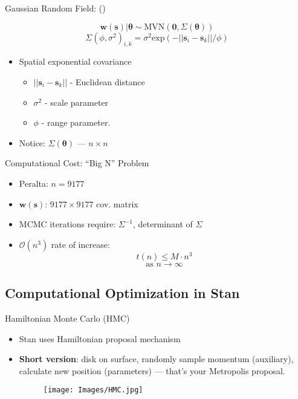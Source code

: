 \documentclass{beamer}
\begin{document}
\begin{frame}{Gaussian Random Field: ()}{} %

$$\pmb{w}(\pmb{s}) | \pmb{\theta} \sim \text{MVN}(\pmb{0}, \Sigma(\pmb{\theta}))$$
$$\Sigma(\phi, \sigma^{2})_{i,k} = \sigma^{2} \text{exp}(-||\pmb{s}_{i} - \pmb{s}_{k}||/\phi)$$
\begin{itemize}
\addtolength{\itemsep}{0.5\baselineskip}
\item Spatial exponential covariance
  \begin{itemize}
  \addtolength{\itemsep}{0.5\baselineskip}
  \item $||\pmb{s}_{i} - \pmb{s}_{k}||$ - Euclidean distance
  \item $\sigma^{2}$ - scale parameter
  \item $\phi$ - range parameter.
  \end{itemize}
\item Notice: $\Sigma(\pmb{\theta})$ --- $n \times n$
\end{itemize}

\end{frame}


\begin{frame}{Computational Cost: ``Big N'' Problem}{}
\begin{itemize}
\addtolength{\itemsep}{0.5\baselineskip}
\item Peralta: $n = 9177$
\item $\pmb{w}(\pmb{s})$: $9177 \times 9177$ cov. matrix
\item MCMC iterations require: $\Sigma^{-1}$, determinant of $\Sigma$
\item $\mathcal{O}(n^{3})$ rate of increase: 
$$t(n) \leq M \cdot n^{3}$$ 
$$ \text{as } n \rightarrow \infty$$
\end{itemize}
\end{frame}

\subsection{Computational Optimization in Stan}

\begin{frame}{Hamiltonian Monte Carlo (HMC)}
\begin{itemize}
\addtolength{\itemsep}{0.5\baselineskip}
\item Stan uses Hamiltonian proposal mechanism
\item {\bf Short version}: disk on surface, randomly sample momentum (auxiliary), calculate new position (parameters) --- that's your Metropolis proposal.
        \begin{figure}[H]
      	\centering
      	\texttt{[image: Images/HMC.jpg]}
      	\end{figure}
\end{itemize}
\end{frame}
\end{document}
